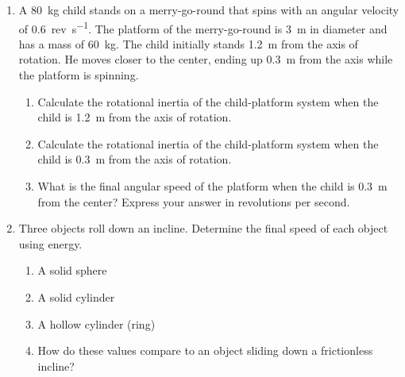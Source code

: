 \begin{enumerate}
	\item A \SI{80}{\kilogram} child stands on a merry-go-round that spins with an angular velocity of \SI{0.6}{rev\per\second}. The platform of the merry-go-round is \SI{3}{\meter} in diameter and has a mass of \SI{60}{\kilogram}. The child initially stands \SI{1.2}{\meter} from the axis of rotation. He moves closer to the center, ending up \SI{0.3}{\meter} from the axis while the platform is spinning.
	
		\begin{enumerate}
			\setlength\itemsep{2 in}
			\item Calculate the rotational inertia of the child-platform system when the child is \SI{1.2}{\meter} from the axis of rotation.
			
			\item Calculate the rotational inertia of the child-platform system when the child is \SI{0.3}{\meter} from the axis of rotation.
			
			\item What is the final angular speed of the platform when the child is \SI{0.3}{\meter} from the center? Express your answer in revolutions per second.
		\end{enumerate}
	
	\item Three objects roll down an incline. Determine the final speed of each object using energy.
	
		\begin{enumerate}
			\setlength\itemsep{2 in}
			\item A solid sphere
			
			\item A solid cylinder
			
			\item A hollow cylinder (ring)
			
			\item How do these values compare to an object sliding down a frictionless incline?
		\end{enumerate}
	
\end{enumerate}